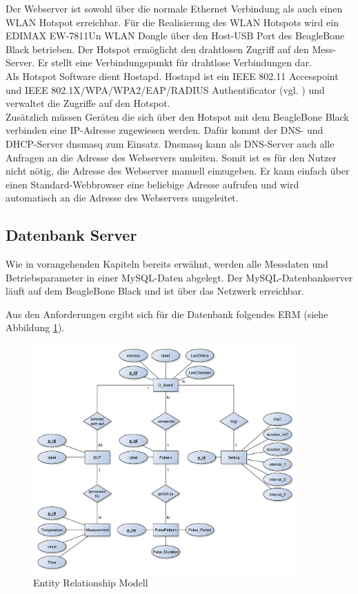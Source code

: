 Der Webserver ist sowohl über die normale Ethernet Verbindung als auch einen WLAN Hotspot erreichbar. Für die Realisierung des WLAN Hotspots wird ein EDIMAX EW-7811Un WLAN Dongle über den Host-USB Port des BeagleBone Black betrieben. Der Hotspot ermöglicht den drahtlosen Zugriff auf den Mess-Server. Er stellt eine Verbindungspunkt für drahtlose Verbindungen dar.\\
Als Hotspot Software dient Hostapd. Hostapd ist ein IEEE 802.11 Accesspoint und IEEE 802.1X/WPA/WPA2/EAP/RADIUS Authentificator (vgl. \cite{LinuxWireless}) und verwaltet die Zugriffe auf den Hotspot.\\
Zusätzlich müssen Geräten die sich über den Hotspot mit dem BeagleBone Black verbinden eine IP-Adresse zugewiesen werden. Dafür kommt der DNS- und DHCP-Server dnsmasq zum Einsatz. Dnsmasq kann als DNS-Server auch alle Anfragen an die Adresse des Webservers umleiten. Somit ist es für den Nutzer nicht nötig, die Adresse des Webserver manuell einzugeben. Er kann einfach über einen Standard-Webbrowser eine beliebige Adresse aufrufen und wird automatisch an die Adresse des Webservers umgeleitet.\\




\newpage

\subsection{Datenbank Server}
\label{section_EntwurfDatenbank}

Wie in vorangehenden Kapiteln bereits erwähnt, werden alle Messdaten und Betriebsparameter in einer MySQL-Daten abgelegt. Der MySQL-Datenbankserver läuft auf dem BeagleBone Black und ist über das Netzwerk erreichbar.

Aus den Anforderungen ergibt sich für die Datenbank folgendes \ac{ERM} (siehe Abbildung \ref{ERM}). \\

\begin{figure}[H]
\begin{center}
\includegraphics[width=0.9\textwidth]{img/general/ER_Diagramm.pdf}
\caption{Entity Relationship Modell}
\label{ERM}
\end{center}
\end{figure}

